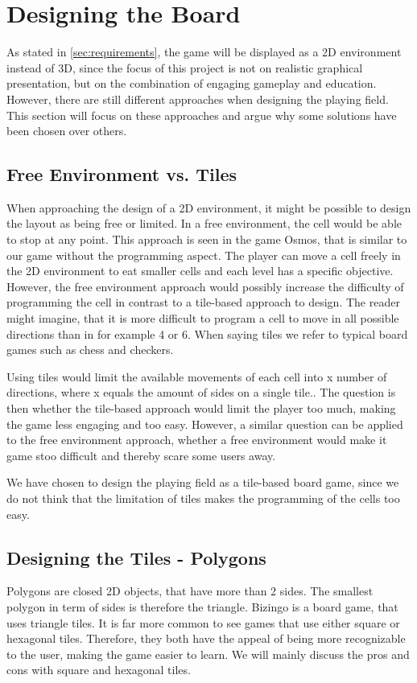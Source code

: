 \section{Designing the Board}
\label{sec:designing_playing_field}

As stated in \autoref{sec:requirements}, the game will be displayed as a 2D environment instead of 3D, since the focus of this project is not on realistic graphical presentation, but on the combination of engaging gameplay and education.
However, there are still different approaches when designing the playing field.
This section will focus on these approaches and argue why some solutions have been chosen over others.

\subsection{Free Environment vs. Tiles}
When approaching the design of a 2D environment, it might be possible to design the layout as being free or limited.
In a free environment, the cell would be able to stop at any point.
This approach is seen in the game Osmos, that is similar to our game without the programming aspect.
The player can move a cell freely in the 2D environment to eat smaller cells and each level has a specific objective.
However, the free environment approach would possibly increase the difficulty of programming the cell in contrast to a tile-based approach to design.
The reader might imagine, that it is more difficult to program a cell to move in all possible directions than in for example 4 or 6.
When saying tiles we refer to typical board games such as chess and checkers.\newline

Using tiles would limit the available movements of each cell into x number of directions, where x equals the amount of sides on a single tile..
The question is then whether the tile-based approach would limit the player too much, making the game less engaging and too easy.
However, a similar question can be applied to the free environment approach, whether a free environment would make it game stoo difficult and thereby scare some users away.\newline

We have chosen to design the playing field as a tile-based board game, since we do not think that the limitation of tiles makes the programming of the cells too easy.

\subsection{Designing the Tiles - Polygons}
Polygons are closed 2D objects, that have more than 2 sides.
The smallest polygon in term of sides is therefore the triangle.
Bizingo is a board game, that uses triangle tiles.
It is far more common to see games that use either square or hexagonal tiles.
Therefore, they both have the appeal of being more recognizable to the user, making the game easier to learn.
We will mainly discuss the pros and cons with square and hexagonal tiles.

